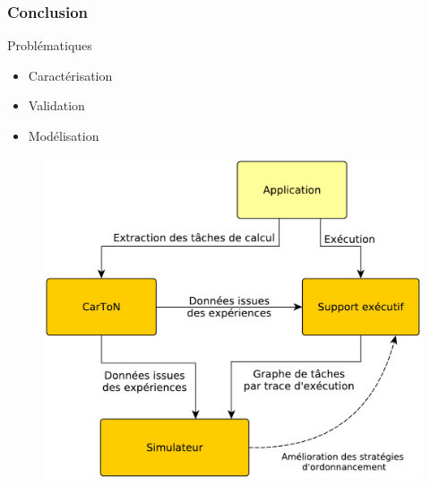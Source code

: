 \documentclass[xcolor={usenames,dvipsnames,svgnames,table}, aspectratio=43]{beamer}
\begin{document}
\begin{frame}
  \frametitle{Conclusion}

  \begin{minipage}[t]{0.36\linewidth}
    \begin{block}{Problématiques}
      \begin{itemize}
	\item Caractérisation
	\item Validation
	\item Modélisation
      \end{itemize}
    \end{block}
  \end{minipage}
      \hfill
  \begin{minipage}[t]{0.60\linewidth}
    \begin{figure}
      \includegraphics[width=\textwidth]{graph/big_picture.pdf}%
    \end{figure}
  \end{minipage}
\end{frame}
\end{document}
